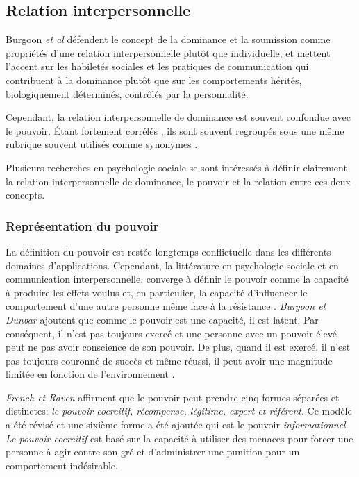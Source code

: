 	\subsection{Relation interpersonnelle}
		Burgoon \emph{et al} \cite{burgoon1998nature} défendent le concept de la dominance et la soumission comme propriétés d'une relation interpersonnelle plutôt que individuelle, et mettent l'accent sur les habiletés sociales et les pratiques de communication qui contribuent à la dominance plutôt que sur les comportements hérités, biologiquement déterminés, contrôlés par la personnalité.
		
		Cependant, la relation interpersonnelle de dominance est souvent confondue avec le pouvoir. Étant fortement corrélés \cite{dunbar2005perceptions}, ils sont souvent regroupés sous une même rubrique souvent utilisés comme synonymes  \cite{ellyson1985power,burgoon1998nature}.
		
		Plusieurs recherches en psychologie sociale \cite{burgoon1998nature,dunbar2005perceptions,burgoon2006nonverbal} se sont intéressés à définir clairement la relation interpersonnelle de dominance, le pouvoir et la relation entre ces deux concepts. 
		
		\subsubsection{Représentation du pouvoir}
		
		La définition du pouvoir est restée longtemps conflictuelle dans les différents domaines d'applications. Cependant, la littérature en psychologie sociale et en communication interpersonnelle, converge à définir le pouvoir comme la capacité à produire les effets voulus et, en particulier, la capacité d'influencer le comportement d'une autre personne même face à la résistance  \cite{burgoon2000interactionist,burgoon2006nonverbal,huston1983power}.
		\emph{Burgoon et Dunbar} \cite{burgoon1998nature,dunbar2005perceptions} ajoutent que comme le pouvoir est une capacité, il est latent. Par conséquent, il n'est pas toujours exercé et une personne avec un pouvoir élevé peut ne pas avoir conscience de son pouvoir. De plus, quand il est exercé, il n'est pas toujours couronné de succès et même réussi, il peut avoir une magnitude limitée en fonction de l'environnement \cite{huston1983power}.
		
		\emph{French et Raven}\cite{french1959bases} affirment que le pouvoir peut prendre cinq formes séparées et distinctes: \textit{le pouvoir coercitif, récompense, légitime, expert et référent}. Ce modèle a été révisé et une sixième forme a été ajoutée qui est le pouvoir \textit{informationnel}.
		\textit{Le pouvoir coercitif} est basé sur la capacité à utiliser des menaces pour forcer une personne à agir contre son gré et d'administrer une punition pour un comportement indésirable.
		
